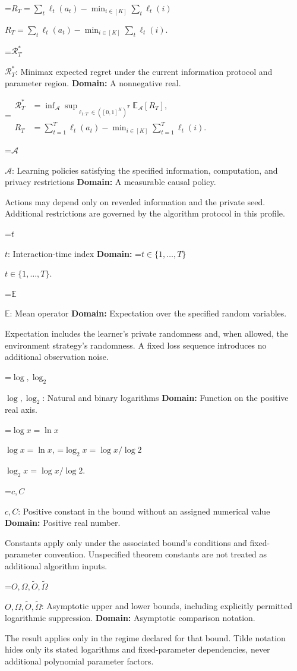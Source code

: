 \documentclass[10pt,a4paper]{article}
\newcommand{\AtlasMath}[1]{\par\begingroup\centering\setbox0=\hbox{$\displaystyle #1$}\ifdim\wd0>1.4\linewidth\typeout{ATLAS WIDE FORMULA: \the\wd0}\fi\ifdim\wd0>\linewidth\resizebox{\linewidth}{!}{\box0}\else\box0\fi\par\endgroup}
\newcommand{\AtlasInlineMath}[1]{\begingroup\setbox0=\hbox{$#1$}\ifdim\wd0>.4\linewidth\endgroup\AtlasMath{#1}\else\endgroup$#1$\fi}
\begin{document}
\AtlasInlineMath{R_T=\sum_t\ell_t(a_t)-\min_{i\in[K]}\sum_t\ell_t(i)}.

\AtlasInlineMath{\mathcal R_T^*}: Minimax expected regret under the current information protocol and parameter region. \textbf{Domain:} A nonnegative real.


\AtlasMath{\begin{aligned}\mathcal R_T^*&=\inf_{\mathcal A}\sup_{\ell_{1:T}\in([0,1]^K)^T}\mathbb E_{\mathcal A}[R_T],\\ R_T&=\sum_{t=1}^T\ell_t(a_t)-\min_{i\in[K]}\sum_{t=1}^T\ell_t(i).\end{aligned}}


\AtlasInlineMath{\mathcal A}: Learning policies satisfying the specified information, computation, and privacy restrictions \textbf{Domain:} A measurable causal policy.

Actions may depend only on revealed information and the private seed. Additional restrictions are governed by the algorithm protocol in this profile.

\AtlasInlineMath{t}: Interaction-time index \textbf{Domain:} \AtlasInlineMath{t\in\{1,\ldots,T\}}.

\AtlasInlineMath{\mathbb E}: Mean operator \textbf{Domain:} Expectation over the specified random variables.

Expectation includes the learner's private randomness and, when allowed, the environment strategy's randomness. A fixed loss sequence introduces no additional observation noise.

\AtlasInlineMath{\log,\log_2}: Natural and binary logarithms \textbf{Domain:} Function on the positive real axis.

\AtlasInlineMath{\log x=\ln x}, \AtlasInlineMath{\log_2x=\log x/\log2}.

\AtlasInlineMath{c,C}: Positive constant in the bound without an assigned numerical value \textbf{Domain:} Positive real number.

Constants apply only under the associated bound’s conditions and fixed-parameter convention. Unspecified theorem constants are not treated as additional algorithm inputs.

\AtlasInlineMath{O,\Omega,\widetilde O,\widetilde\Omega}: Asymptotic upper and lower bounds, including explicitly permitted logarithmic suppression. \textbf{Domain:} Asymptotic comparison notation.

The result applies only in the regime declared for that bound. Tilde notation hides only its stated logarithms and fixed-parameter dependencies, never additional polynomial parameter factors.
\end{document}
